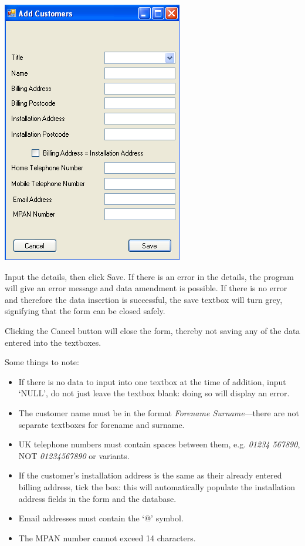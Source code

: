 		\includegraphics[scale=0.5]{frmAddCustomer_scrot}
		
		Input the details, then click Save.  If there is an error in the details, the program will give an error message and data amendment is possible.  If there is no error and therefore the data insertion is successful, the save textbox will turn grey, signifying that the form can be closed safely.  
		
		Clicking the Cancel button will close the form, thereby not saving any of the data entered into the textboxes.

		Some things to note:
		
		\begin{itemize}
			\item{If there is no data to input into one textbox at the time of addition, input `NULL', do not just leave the textbox blank: doing so will display an error.}
			\item{The customer name must be in the format \textsl{Forename Surname}---there are not separate textboxes for forename and surname.}
			\item{UK telephone numbers must contain spaces between them, e.g. \textsl{01234 567890}, \textsc{NOT} \textsl{01234567890} or variants.}
			\item{If the customer's installation address is the same as their already entered billing address, tick the box: this will automatically populate the installation address fields in the form and the database.}
			\item{Email addresses must contain the `@' 
symbol.}
			\item{The MPAN number cannot exceed 14 characters.}
		\end{itemize}
		
